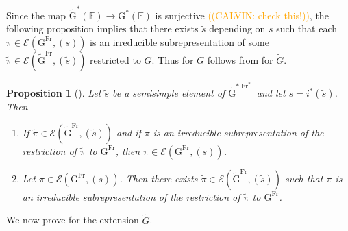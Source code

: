 \documentclass[12pt, reqno]{amsart}
\newtheorem{proposition}[theorem]{Proposition}
\theoremstyle{definition}
\theoremstyle{definition}
\theoremstyle{definition}
\newcommand{\GroupExtension}[1]{\widetilde{#1}}
\newcommand{\finiteField}{\mathbb{F}}
\newcommand{\Frobenius}{\operatorname{Fr}}
\newcommand{\algebraicGroup}[1]{\boldsymbol{\mathrm{#1}}}
\newcommand{\LusztigSeries}[2]{\mathcal{E}\left(#1, (#2)\right)}
\newcommand{\DualFrobeniusFixedPoints}[2][\Frobenius^{\ast}]{\algebraicGroup{#2}^{\ast #1}}
\newcommand{\FrobeniusFixedPoints}[2][\Frobenius]{\algebraicGroup{#2}^{#1}}
\newcommand{\calvin}[1]{\textcolor{orange}{\sffamily ((CALVIN: #1))}}
\begin{document}
Since the map $\algebraicGroup{\GroupExtension{G}}^*(\finiteField) \to \algebraicGroup{G}^*(\finiteField)$ is surjective \calvin{check this!}, the following proposition implies that there exists $\tilde{s}$ depending on $s$ such that each $\pi \in \LusztigSeries{\FrobeniusFixedPoints{G}}{s}$ is an irreducible subrepresentation of some $\tilde{\pi} \in \LusztigSeries{\FrobeniusFixedPoints{\GroupExtension{G}}}{\tilde{s}}$ restricted to $G$. Thus  for $G$ follows from  for $\GroupExtension{G}$. 

\begin{proposition}[{\cite[Proposition 11.7]{Bonnafe2006}}]
	Let $\tilde{s}$ be a semisimple element of $\DualFrobeniusFixedPoints{\GroupExtension{G}}$ and let $s = i^{\ast}\left(\tilde{s}\right)$. Then
	\begin{enumerate}
		\item If $\tilde{\pi} \in \LusztigSeries{\FrobeniusFixedPoints{\GroupExtension{G}}}{\tilde{s}}$ and if $\pi$ is an irreducible subrepresentation of the restriction of $\tilde{\pi}$ to $\FrobeniusFixedPoints{G}$, then $\pi \in \LusztigSeries{\FrobeniusFixedPoints{G}}{s}$.
		\item Let $\pi \in \LusztigSeries{\FrobeniusFixedPoints{G}}{s}$. Then there exists $\tilde{\pi} \in \LusztigSeries{\FrobeniusFixedPoints{\GroupExtension{G}}}{\tilde{s}}$ such that $\pi$ is an irreducible subrepresentation of the restriction of $\tilde{\pi}$ to $\FrobeniusFixedPoints{G}$.
	\end{enumerate}
\end{proposition}

We now prove  for the extension $\GroupExtension{G}$.
\end{document}
